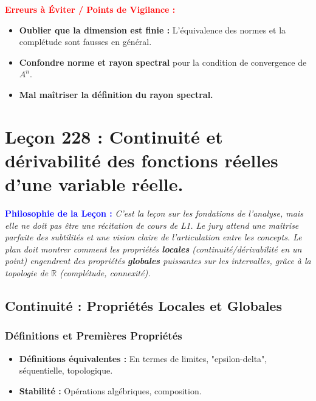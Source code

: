 \documentclass[12pt, a4paper, parskip=full]{report}
\theoremstyle{agregstyle}
\newenvironment{philosophie}
  {\par\medskip\noindent\begin{oframed}\noindent\textbf{\textcolor{blue}{Philosophie de la Leçon :}}\itshape}
  {\end{oframed}\par\medskip}
\newenvironment{erreurs}
  {\par\medskip\noindent\begin{oframed}\noindent\textbf{\textcolor{red}{Erreurs à Éviter / Points de Vigilance :}}}
  {\end{oframed}\par\medskip}
\begin{document}
\begin{erreurs}
    \begin{itemize}
        \item \textbf{Oublier que la dimension est finie :} L'équivalence des normes et la complétude sont fausses en général.
        \item \textbf{Confondre norme et rayon spectral} pour la condition de convergence de $A^n$.
        \item \textbf{Mal maîtriser la définition du rayon spectral.}
    \end{itemize}
\end{erreurs}
\chapter{Leçon 228 : Continuité et dérivabilité des fonctions réelles d'une variable réelle.}

\begin{philosophie}
    C'est la leçon sur les fondations de l'analyse, mais elle ne doit pas être une récitation de cours de L1. Le jury attend une maîtrise parfaite des subtilités et une vision claire de l'articulation entre les concepts. Le plan doit montrer comment les propriétés \textbf{locales} (continuité/dérivabilité en un point) engendrent des propriétés \textbf{globales} puissantes sur les intervalles, grâce à la topologie de $\mathbb{R}$ (complétude, connexité).
\end{philosophie}

\section{Continuité : Propriétés Locales et Globales}
\subsection{Définitions et Premières Propriétés}
\begin{itemize}
    \item \textbf{Définitions équivalentes :} En termes de limites, "epsilon-delta", séquentielle, topologique.
    \item \textbf{Stabilité :} Opérations algébriques, composition.
\end{itemize}
\end{document}
